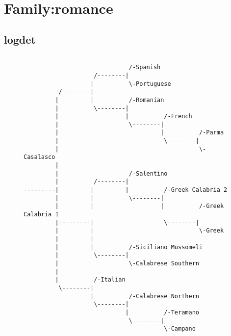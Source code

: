 \section{Family:romance}
\subsection{logdet}
\begin{figure}[!htb]
\begin{center}
{
\selectfont
\begin{verbatim}

                              /-Spanish
                    /--------|
                   |          \-Portuguese
          /--------|
         |         |          /-Romanian
         |          \--------|
         |                   |          /-French
         |                    \--------|
         |                             |          /-Parma
         |                              \--------|
         |                                        \-Casalasco
         |
         |                    /-Salentino
         |          /--------|
---------|         |         |          /-Greek Calabria 2
         |         |          \--------|
         |         |                   |          /-Greek Calabria 1
         |---------|                    \--------|
         |         |                              \-Greek
         |         |
         |         |          /-Siciliano Mussomeli
         |          \--------|
         |                    \-Calabrese Southern
         |
         |          /-Italian
          \--------|
                   |          /-Calabrese Northern
                    \--------|
                             |          /-Teramano
                              \--------|
                                        \-Campano

\end{verbatim}
}
\label{...}
\end{center}
\end{figure}
